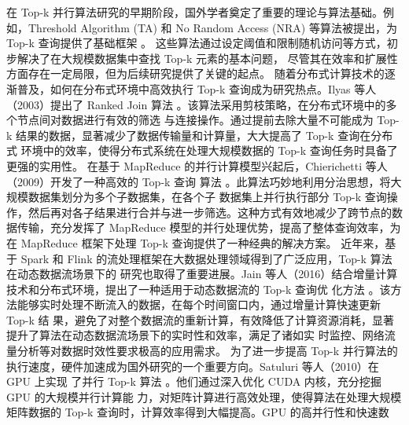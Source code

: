 



在 Top-k 并行算法研究的早期阶段，国外学者奠定了重要的理论与算法基础。例如，Threshold Algorithm (TA) 和 No Random Access 
(NRA) 等算法被提出，为 Top-k 查询提供了基础框架 \cite {fagin2001}。
这些算法通过设定阈值和限制随机访问等方式，初步解决了在大规模数据集中查找 Top-k 元素的基本问题，
尽管其在效率和扩展性方面存在一定局限，但为后续研究提供了关键的起点。
随着分布式计算技术的逐渐普及，如何在分布式环境中高效执行 Top-k 查询成为研究热点。Ilyas 等人（2003）提出了
 Ranked Join 算法 \cite {ilyas2003}。该算法采用剪枝策略，在分布式环境中的多个节点间对数据进行有效的筛选
 与连接操作。通过提前去除大量不可能成为 Top-k 结果的数据，显著减少了数据传输量和计算量，大大提高了 Top-k 查询在分布式
 环境中的效率，使得分布式系统在处理大规模数据的 Top-k 查询任务时具备了更强的实用性。
在基于 MapReduce 的并行计算模型兴起后，Chierichetti 等人（2009）开发了一种高效的 Top-k 查询
算法 \cite {chierichetti2009}。此算法巧妙地利用分治思想，将大规模数据集划分为多个子数据集，在各个子
数据集上并行执行部分 Top-k 查询操作，然后再对各子结果进行合并与进一步筛选。这种方式有效地减少了跨节点的数据传输，充分发挥了 MapReduce 模型的并行处理优势，提高了整体查询效率，为在 MapReduce 框架下处理 Top-k 查询提供了一种经典的解决方案。
近年来，基于 Spark 和 Flink 的流处理框架在大数据处理领域得到了广泛应用，Top-k 算法在动态数据流场景下的
研究也取得了重要进展。Jain 等人（2016）结合增量计算技术和分布式环境，提出了一种适用于动态数据流的 Top-k 查询优
化方法 \cite {jain2016}。该方法能够实时处理不断流入的数据，在每个时间窗口内，通过增量计算快速更新 Top-k 结
果，避免了对整个数据流的重新计算，有效降低了计算资源消耗，显著提升了算法在动态数据流场景下的实时性和效率，满足了诸如实
时监控、网络流量分析等对数据时效性要求极高的应用需求。
为了进一步提高 Top-k 并行算法的执行速度，硬件加速成为国外研究的一个重要方向。Satuluri 等人（2010）在 GPU 上实现
了并行 Top-k 算法 \cite {satuluri2010}。他们通过深入优化 CUDA 内核，充分挖掘 GPU 的大规模并行计算能
力，对矩阵计算进行高效处理，使得算法在处理大规模矩阵数据的 Top-k 查询时，计算效率得到大幅提高。GPU 的高并行性和快速数
